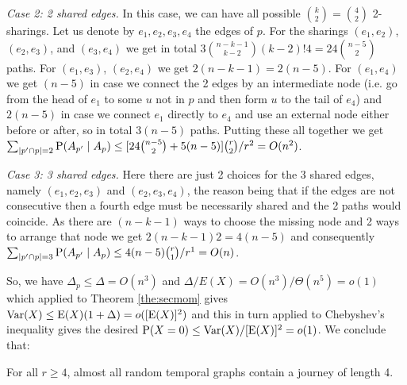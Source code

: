 \documentclass[oribibl, 11pt]{llncs}
\renewcommand{\P}{\textup{P}}
\newcommand{\E}{\textup{E}}
\newcommand{\Var}{\textup{Var}}
\begin{document}
\emph{Case 2: 2 shared edges.} In this case, we can have all possible $\binom{k}{2}=\binom{4}{2}$ 2-sharings. Let us denote by $e_1,e_2,e_3,e_4$ the edges of $p$. For the sharings $(e_1,e_2)$, $(e_2,e_3)$, and $(e_3,e_4)$ we get in total $3\binom{n-k-1}{k-2}(k-2)!4=24\binom{n-5}{2}$ paths. For $(e_1,e_3)$, $(e_2,e_4)$ we get $2(n-k-1)=2(n-5)$. For $(e_1,e_4)$ we get $(n-5)$ in case we connect the 2 edges by an intermediate node (i.e. go from the head of $e_1$ to some $u$ not in $p$ and then form $u$ to the tail of $e_4$) and $2(n-5)$ in case we connect $e_1$ directly to $e_4$ and use an external node either before or after, so in total $3(n-5)$ paths. Putting these all together we get $\sum_{|p^\prime\cap p|=2} \P(A_{p^\prime}\mid A_p)\leq[24\binom{n-5}{2}+5(n-5)]\binom{r}{2}/r^{2}=O(n^2)$.

\emph{Case 3: 3 shared edges.} Here there are just 2 choices for the 3 shared edges, namely $(e_1,e_2,e_3)$ and $(e_2,e_3,e_4)$, the reason being that if the edges are not consecutive then a fourth edge must be necessarily shared and the 2 paths would coincide. As there are $(n-k-1)$ ways to choose the missing node and 2 ways to arrange that node we get $2(n-k-1)2=4(n-5)$ and consequently $\sum_{|p^\prime\cap p|=3} \P(A_{p^\prime}\mid A_p)\leq 4(n-5)\binom{r}{1}/r^{1}=O(n)$.

So, we have $\Delta_p\leq \Delta=O(n^3)$ and $\Delta/E(X)=O(n^3)/\Theta(n^5)=o(1)$ which applied to Theorem \ref{the:secmom} gives $\Var(X)\leq \E(X)(1+\Delta)=o([\E(X)]^2)$ and this in turn applied to Chebyshev's inequality gives the desired $\P(X=0)\leq \Var(X)/[\E(X)]^2=o(1)$. We conclude that:

\begin{theorem}
For all $r\geq 4$, almost all random temporal graphs contain a journey of length 4.
\end{theorem}
\end{document}

